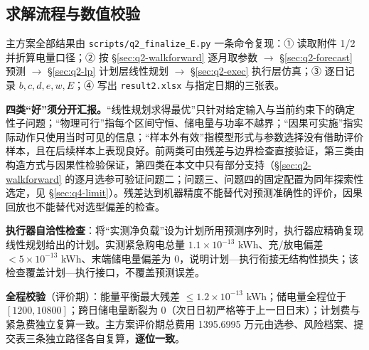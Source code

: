 \subsection{求解流程与数值校验}

主方案全部结果由 \texttt{scripts/q2\_finalize\_E.py} 一条命令复现：① 读取附件 1/2 并折算电量口径；② 按 \S\ref{sec:q2-walkforward} 逐月取参数 $\to$ \S\ref{sec:q2-forecast} 预测 $\to$ \S\ref{sec:q2-lp} 计划层线性规划 $\to$ \S\ref{sec:q2-exec} 执行层仿真；③ 逐日记录 $b,c,d,e,w,E$；④ 写出 \texttt{result2.xlsx} 与指定日期的三张表。

\textbf{四类``好''须分开汇报。}``线性规划求得最优''只针对给定输入与当前约束下的确定性子问题；``物理可行''指每个区间守恒、储电量与功率不越界；``因果可实施''指实际动作只使用当时可见的信息；``样本外有效''指模型形式与参数选择没有借助评价样本，且在后续样本上表现良好。前两类可由残差与边界检查直接验证，第三类由构造方式与因果性检验保证，第四类在本文中只有部分支持（\S\ref{sec:q2-walkforward} 的逐月选参可验证问题二；问题三、问题四的固定配置为同年探索性选定，见 \S\ref{sec:q4-limit}）。残差达到机器精度不能替代对预测准确性的评价，因果回放也不能替代对选型偏差的检查。

\textbf{执行器自洽性检查}：将``实测净负载''设为计划所用预测序列时，执行器应精确复现线性规划给出的计划。实测紧急购电总量 $1.1\times10^{-13}$ kWh、充/放电偏差 $<5\times10^{-13}$ kWh、末端储电量偏差为 0，说明计划—执行衔接无结构性损失；该检查覆盖计划—执行接口，不覆盖预测误差。

\textbf{全程校验}（评价期）：能量平衡最大残差 $\le1.2\times10^{-13}$ kWh；储电量全程位于 $[1200,10800]$；跨日储电量断裂为 0（次日日初严格等于上一日日末）；计划费与紧急费独立复算一致。主方案评价期总费用 1395.6995 万元由选参、风险档案、提交表三条独立路径各自复算，\textbf{逐位一致}。
